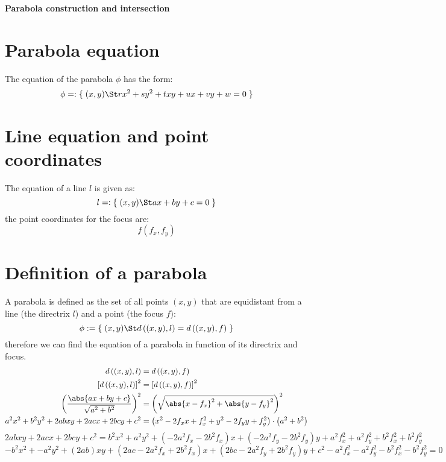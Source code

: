 \documentclass[11pt,a4paper,english]{article}
\begin{document}
    {\centering\huge\textbf{Parabola construction and intersection}\par}

    \vspace{1cm}

    \section*{Parabola equation}
    The equation of the parabola \(\phi\) has the form:
    \[
    	\phi =: \{\;(x,y) \St rx^{2} + sy^{2} + txy + ux + vy + w = 0\;\}
    \]

    \section*{Line equation and point coordinates}
    The equation of a line \(l\) is given as:
    \[
    	l =: \{\;(x,y) \St ax + by + c = 0\;\}
    \]
    the point coordinates for the focus are:
    \[
    	f(f_{x},f_{y})
    \]

    \section*{Definition of a parabola}
    A parabola is defined as the set of all points \((x,y)\) that are equidistant from a line (the directrix \(l\)) and a point (the focus \(f\)):
    \[
    	\phi := \{\;(x,y) \St d\left((x,y),l\right) = d\left((x,y),f\right)\;\}
    \]
    therefore we can find the equation of a parabola in function of its directrix and focus.
    \begin{align*}
    d\left((x,y),l\right) &= d\left((x,y),f\right) \\
	\left[d\left((x,y),l\right)\right]^2 &= \left[d\left((x,y),f\right)\right]^2 \\
	\left(\frac{\abs{ax + by + c}}{\sqrt{a^{2} + b^{2}}}\right)^{2} &= \left(\sqrt{\abs{x - f_{x}}^{2} + \abs{y - f_{y}}^{2}}\right)^{2} \\
	a^{2}x^{2} + b^{2}y^{2} + 2abxy + 2acx + 2bcy + c^{2} &= \left(x^{2} - 2f_{x}x + f_{x}^{2} + y^{2} - 2f_{y}y + f_{y}^{2}\right) \cdot \left(a^{2} + b^{2}\right)
	\end{align*}
	\[
		2abxy + 2acx + 2bcy + c^{2} = b^{2}x^{2} + a^{2}y^{2} + (-2a^{2}f_{x}-2b^{2}f_{x})x + (-2a^{2}f_{y}-2b^{2}f_{y})y + a^{2}f_{x}^{2} + a^{2}f_{y}^{2} + b^{2}f_{x}^{2} + b^{2}f_{y}^{2}
	\]
	\[
		-b^{2}x^{2} + -a^{2}y^{2} + (2ab)xy + (2ac-2a^{2}f_{x} + 2b^{2}f_{x})x + (2bc-2a^{2}f_{y} + 2b^{2}f_{y})y + c^{2} - a^{2}f_{x}^{2} - a^{2}f_{y}^{2} - b^{2}f_{x}^{2} - b^{2}f_{y}^{2} = 0
	\]
	\ppar\bigskip
\end{document}
